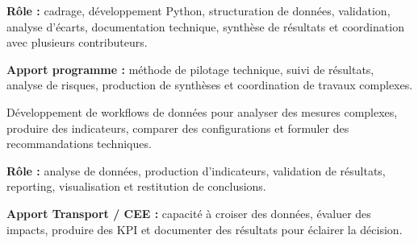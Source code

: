 \documentclass[8pt,a4paper,ragged2e,withhyper]{altacv}
\begin{document}
\textbf{Rôle :} cadrage, développement Python, structuration de données, validation, analyse d’écarts, documentation technique, synthèse de résultats et coordination avec plusieurs contributeurs.

\textbf{Apport programme :} méthode de pilotage technique, suivi de résultats, analyse de risques, production de synthèses et coordination de travaux complexes.

\divider


Développement de workflows de données pour analyser des mesures complexes, produire des indicateurs, comparer des configurations et formuler des recommandations techniques.

\textbf{Rôle :} analyse de données, production d’indicateurs, validation de résultats, reporting, visualisation et restitution de conclusions.

\textbf{Apport Transport / CEE :} capacité à croiser des données, évaluer des impacts, produire des KPI et documenter des résultats pour éclairer la décision.


\vspace{-.3cm}


{\small
{}
}

\divider\smallskip
\vspace{-.3cm}


{\small
{}
}

\divider\smallskip
\vspace{-.3cm}
\end{document}
